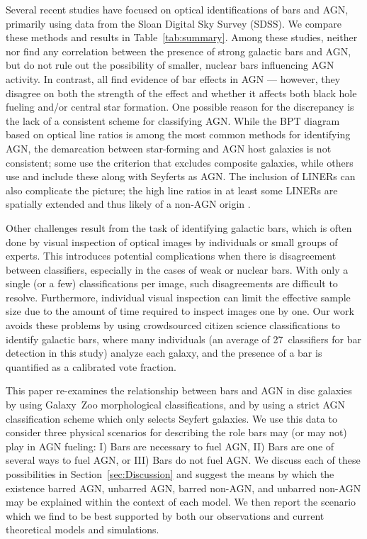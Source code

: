 Several recent studies have focused on optical identifications of bars and AGN, primarily using data from the Sloan Digital Sky Survey (SDSS). We compare these methods and results in Table~\ref{tab:summary}. Among these studies, neither \citet{Lee2012} nor \citet{Martini2003} find any correlation between the presence of strong galactic bars and AGN, but do not rule out the possibility of smaller, nuclear bars influencing AGN activity. In contrast, \citet{Oh2012,Hao2009a,Alonso2013} all find evidence of bar effects in AGN --- however, they disagree on both the strength of the effect and whether it affects both black hole fueling and/or central star formation. One possible reason for the discrepancy is the lack of a consistent scheme for classifying AGN. While the BPT diagram based on optical line ratios \citep{Baldwin1981} is among the most common methods for identifying AGN, the demarcation between star-forming and AGN host galaxies is not consistent; some use the \citet{Kewley2001} criterion that excludes composite galaxies, while others use \citet{Kauffmann2003a} and include these along with Seyferts as AGN. The inclusion of LINERs can also complicate the picture; the high line ratios in at least some LINERs are spatially extended and thus likely of a non-AGN origin \citep{Sarzi2010,Yan2012,Singh2013}. 

Other challenges result from the task of identifying galactic bars, which is often done by visual inspection of optical images by individuals or small groups of experts. This introduces potential complications when there is disagreement between classifiers, especially in the cases of weak or nuclear bars. With only a single (or a few) classifications per image, such disagreements are difficult to resolve. Furthermore, individual visual inspection can limit the effective sample size due to the amount of time required to inspect images one by one. Our work avoids these problems by using crowdsourced citizen science classifications to identify galactic bars, where many individuals (an average of 27~classifiers for bar detection in this study) analyze each galaxy, and the presence of a bar is quantified as a calibrated vote fraction.
   
This paper re-examines the relationship between bars and AGN in disc galaxies by using Galaxy~Zoo morphological classifications, and by using a strict AGN classification scheme which only selects Seyfert galaxies. We use this data to consider three physical scenarios for describing the role bars may (or may not) play in AGN fueling: I) Bars are necessary to fuel AGN, II) Bars are one of several ways to fuel AGN, or III) Bars do not fuel AGN. We discuss each of these possibilities in Section~\ref{sec:Discussion} and suggest the means by which the existence barred AGN, unbarred AGN, barred non-AGN, and unbarred non-AGN may be explained within the context of each model. We then report the scenario which we find to be best supported by both our observations and current theoretical models and simulations.  


